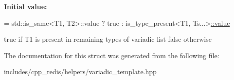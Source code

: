{\bfseries Initial value\+:}
\begin{DoxyCode}
= std::is\_same<T1, T2>::value
                                  ? true
                                  : is\_type\_present<T1, Ts...>\hyperlink{structcpp__redis_1_1helpers_1_1is__type__present_a7b5e8d970ba974a9b58cbc440983c25c}{::value}
\end{DoxyCode}
true if T1 is present in remaining types of variadic list false otherwise 

The documentation for this struct was generated from the following file\+:\begin{DoxyCompactItemize}
\item 
includes/cpp\+\_\+redis/helpers/variadic\+\_\+template.\+hpp\end{DoxyCompactItemize}
